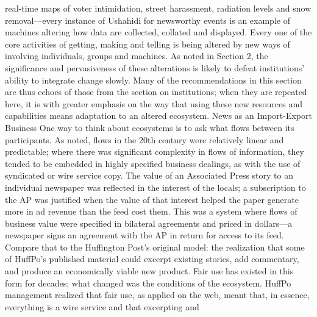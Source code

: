 real-time maps of voter intimidation, street harassment, radiation levels
and snow removal—every instance of Ushahidi for newsworthy events
is an example of machines altering how data are collected, collated
and displayed.
Every one of the core activities of getting, making and telling is being altered
by new ways of involving individuals, groups and machines. As noted in Section
2, the significance and pervasiveness of these alterations is likely to defeat
institutions’ ability to integrate change slowly. Many of the recommendations in
this section are thus echoes of those from the section on institutions; when they
are repeated here, it is with greater emphasis on the way that using these new
resources and capabilities means adaptation to an altered ecosystem.
News as an Import-Export Business
One way to think about ecosystems is to ask what flows between its participants.
As noted, flows in the 20th century were relatively linear and predictable;
where there was significant complexity in flows of information, they tended to
be embedded in highly specified business dealings, as with the use of syndicated
or wire service copy.
The value of an Associated Press story to an individual newspaper was reflected
in the interest of the locals; a subscription to the AP was justified when the
value of that interest helped the paper generate more in ad revenue than the
feed cost them.
This was a system where flows of business value were specified in bilateral agreements
and priced in dollars—a newspaper signs an agreement with the AP in
return for access to its feed. Compare that to the Huffington Post’s original model:
the realization that some of HuffPo’s published material could excerpt existing
stories, add commentary, and produce an economically viable new product.
Fair use has existed in this form for decades; what changed was the conditions
of the ecosystem. HuffPo management realized that fair use, as applied on the
web, meant that, in essence, everything is a wire service and that excerpting and

